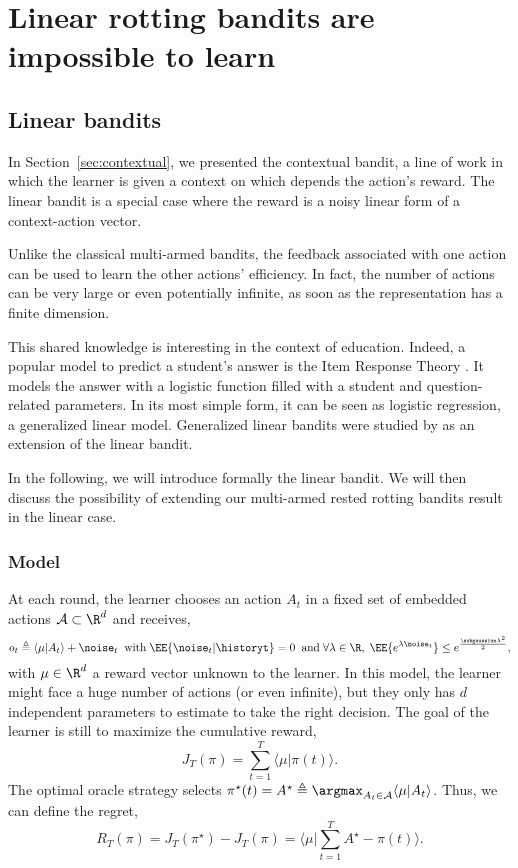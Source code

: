 
\section{Linear rotting bandits are impossible to learn}
\label{sec:linear-rotting}
\subsection{Linear bandits}
\label{ss:linear}
In Section~\ref{sec:contextual}, we presented the contextual bandit, a line of work in which the learner is given a context on which depends the action's reward. The linear bandit is a special case where the reward is a noisy linear form of a context-action vector.

Unlike the classical multi-armed bandits, the feedback associated with one action can be used to learn the other actions' efficiency. In fact, the number of actions can be very large or even potentially infinite, as soon as the representation has a finite dimension. 

This shared knowledge is interesting in the context of education. Indeed, a popular model to predict a student's answer is the Item Response Theory \citep{hambleton2013item}. It models the answer with a logistic function filled with a student and question-related parameters. In its most simple form, it can be seen as logistic regression, a generalized linear model. Generalized linear bandits were studied by \citep{filippi2010parametric} as an extension of the linear bandit.  

In the following, we will introduce formally the linear bandit. We will then discuss the possibility of extending our multi-armed rested rotting bandits result in the linear case. 



\subsubsection{Model} At each round, the learner chooses an action $A_t$ in a fixed set of embedded actions $\mathcal{A} \subset \R^d$ and receives,
 \begin{equation*}
\label{eq:linear-feedback}
o_{t} \triangleq \langle \mu | A_t \rangle + \noise_t
 \;\; \text{with}\; \EE{ \noise_t | \historyt }= 0 \;\; \text{and} \; \forall \lambda \in \R, \; \EE{ e^{\lambda\noise_t}} \leq e^{\frac{\subgaussian\lambda^2}{2}},
\end{equation*}
with $\mu \in \R^d$ a reward vector unknown to the learner. In this model, the learner might face a huge number of actions (or even infinite), but they only has $d$ independent parameters to estimate to take the right decision.  The goal of the learner is still to maximize the cumulative reward, 
\begin{equation*}
J_T(\pi) = \sum_{t=1}^T \langle \mu | \pi(t) \rangle. 
\end{equation*}
The optimal oracle strategy selects $\pi^\star(t) = A^\star \triangleq \argmax_{A_t \in \mathcal{A}} \langle \mu | A_t \rangle$. Thus, we can define the regret, 
\[R_T(\pi) = J_T(\pi^\star) - J_T(\pi) = \langle \mu | \sum_{t=1}^T A^\star - \pi(t) \rangle. \]

